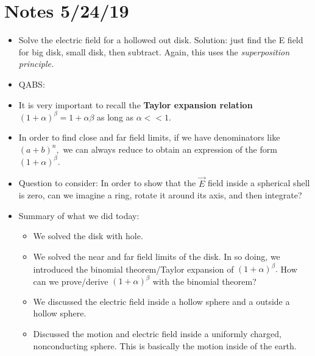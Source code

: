 \documentclass[12pt]{extreport}
\begin{document}

\section{Notes 5/24/19}
\begin{itemize}
	\item Solve the electric field for a hollowed out disk. Solution: just find the E field for big disk, small disk, then subtract. Again, this uses the \textit{superposition principle.}

	\item QABS: 

	\item It is very important to recall the \textbf{Taylor expansion relation} $(1 + \alpha)^\beta = 1+ \alpha \beta$ as long as $\alpha << 1.$

	\item In order to find close and far field limits, if we have denominators like $(a + b)^n,$ we can always reduce to obtain an expression of the form $(1 + \alpha)^\beta.$


	\item Question to consider: In order to show that the $\vec E$ field inside a spherical shell is zero, can we imagine a ring, rotate it around its axis, and then integrate? 

	\item Summary of what we did today:
		\begin{itemize}
			\item We solved the disk with hole.
			\item We solved the near and far field limits of the disk. In so doing, we introduced the binomial theorem/Taylor expansion of $(1+\alpha)^\beta.$ How can we prove/derive $(1+\alpha)^\beta$ with the binomial theorem?
			\item We discussed the electric field inside a hollow sphere and a outside a hollow sphere. 
			\item Discussed the motion and electric field inside a uniformly charged, nonconducting sphere. This is basically the motion inside of the earth. 


\end{itemize}
\end{itemize}
\end{document}

